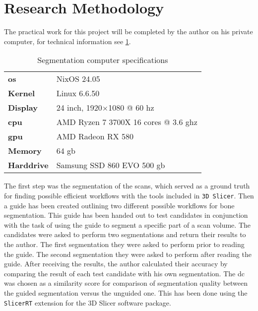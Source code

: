 \section{Research Methodology}\label{s:introduction-researchmethodology}
The practical work for this project will be completed by the author on his private computer, for technical information see \cref{t:computer-specs}.
\begin{table}[ht]
	\centering
	\begin{tabular}{l l}
		\textbf{\acrshort{os}}  & NixOS 24.05                                     \\
		\textbf{Kernel}         & Linux 6.6.50                                    \\
		\textbf{Display}        & 24 inch, 1920$\times$1080 @ 60 \acrshort{hz}    \\
		\textbf{\acrshort{cpu}} & AMD Ryzen 7 3700X 16 cores @ 3.6 \acrshort{ghz} \\
		\textbf{\acrshort{gpu}} & AMD Radeon RX 580                               \\
		\textbf{Memory}         & 64 \acrshort{gb}                                \\
		\textbf{Harddrive}      & Samsung SSD 860 EVO 500 \acrshort{gb}
	\end{tabular}
	\caption{Segmentation computer specifications}\label{t:computer-specs}
\end{table}

\noindent
The first step was the segmentation of the \mct\space scans, which served as a ground truth for finding possible efficient workflows with the tools included in \texttt{3D Slicer}.
Then a guide has been created outlining two different possible workflows for bone segmentation.
This guide has been handed out to test candidates in conjunction with the task of using the guide to segment a specific part of a scan volume.
The candidates were asked to perform two segmentations and return their results to the author.
The first segmentation they were asked to perform prior to reading the guide.
The second segmentation they were asked to perform after reading the guide.
After receiving the results, the author calculated their accuracy by comparing the result of each test candidate with his own segmentation.
The \acrfull{dc} \cite{diceMeasuresAmountEcologic1945} was chosen as a similarity score for comparison of segmentation quality between the guided segmentation versus the unguided one.
This has been done using the \texttt{SlicerRT} \cite{pinterSlicerRTRadiationTherapy2012} extension for the 3D Slicer software package.



